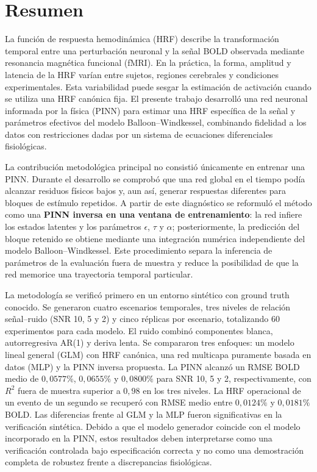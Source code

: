\chapter*{Resumen}

La función de respuesta hemodinámica (HRF) describe la transformación temporal entre una perturbación neuronal y la señal BOLD observada mediante resonancia magnética funcional (fMRI). En la práctica, la forma, amplitud y latencia de la HRF varían entre sujetos, regiones cerebrales y condiciones experimentales. Esta variabilidad puede sesgar la estimación de activación cuando se utiliza una HRF canónica fija. El presente trabajo desarrolló una red neuronal informada por la física (PINN) para estimar una HRF específica de la señal y parámetros efectivos del modelo Balloon--Windkessel, combinando fidelidad a los datos con restricciones dadas por un sistema de ecuaciones diferenciales fisiológicas.

La contribución metodológica principal no consistió únicamente en entrenar una PINN. Durante el desarrollo se comprobó que una red global en el tiempo podía alcanzar residuos físicos bajos y, aun así, generar respuestas diferentes para bloques de estímulo repetidos. A partir de este diagnóstico se reformuló el método como una \textbf{PINN inversa en una ventana de entrenamiento}: la red infiere los estados latentes y los parámetros $\epsilon$, $\tau$ y $\alpha$; posteriormente, la predicción del bloque retenido se obtiene mediante una integración numérica independiente del modelo Balloon--Windkessel. Este procedimiento separa la inferencia de parámetros de la evaluación fuera de muestra y reduce la posibilidad de que la red memorice una trayectoria temporal particular.

La metodología se verificó primero en un entorno sintético con ground truth conocido. Se generaron cuatro escenarios temporales, tres niveles de relación señal--ruido (SNR 10, 5 y 2) y cinco réplicas por escenario, totalizando 60 experimentos para cada modelo. El ruido combinó componentes blanca, autorregresiva AR(1) y deriva lenta. Se compararon tres enfoques: un modelo lineal general (GLM) con HRF canónica, una red multicapa puramente basada en datos (MLP) y la PINN inversa propuesta. La PINN alcanzó un RMSE BOLD medio de $0{,}0577\%$, $0{,}0655\%$ y $0{,}0800\%$ para SNR 10, 5 y 2, respectivamente, con $R^2$ fuera de muestra superior a $0{,}98$ en los tres niveles. La HRF operacional de un evento de un segundo se recuperó con RMSE medio entre $0{,}0124\%$ y $0{,}0181\%$ BOLD. Las diferencias frente al GLM y la MLP fueron significativas en la verificación sintética. Debido a que el modelo generador coincide con el modelo incorporado en la PINN, estos resultados deben interpretarse como una verificación controlada bajo especificación correcta y no como una demostración completa de robustez frente a discrepancias fisiológicas.

